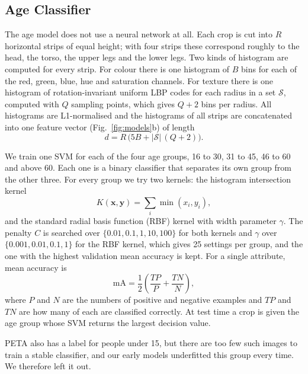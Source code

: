 \documentclass[conference]{IEEEtran}
\newcommand{\mA}{\mathrm{mA}}
\begin{document}
\subsection{Age Classifier}
The age model does not use a neural network at all. Each crop is cut into $R$
horizontal strips of equal height; with four strips these correspond roughly to
the head, the torso, the upper legs and the lower legs. Two kinds of histogram are
computed for every strip. For colour there is one histogram of $B$ bins for each of
the red, green, blue, hue and saturation channels. For texture there is one
histogram of rotation-invariant uniform LBP codes for each radius in a set
$\mathcal{S}$, computed with $Q$ sampling points, which gives $Q+2$ bins per
radius. All histograms are L1-normalised and the histograms of all strips are
concatenated into one feature vector (Fig.~\ref{fig:models}b) of length
\begin{equation}
  d = R\,\bigl(5B + |\mathcal{S}|\,(Q+2)\bigr).
  \label{eq:dim}
\end{equation}

We train one SVM for each of the four age groups, 16 to 30, 31 to 45, 46 to 60 and
above 60. Each one is a binary classifier that separates its own group from the
other three. For every group we try two kernels: the histogram intersection kernel
\begin{equation}
  K(\mathbf{x},\mathbf{y}) = \sum_{i}\min(x_i, y_i),
\end{equation}
and the standard radial basis function (RBF) kernel with width parameter $\gamma$.
The penalty $C$ is searched over $\{0.01, 0.1, 1, 10, 100\}$ for both kernels and
$\gamma$ over $\{0.001, 0.01, 0.1, 1\}$ for the RBF kernel, which gives 25 settings
per group, and the one with the highest validation mean accuracy is kept. For a
single attribute, mean accuracy is
\begin{equation}
  \mA = \frac{1}{2}\left(\frac{\mathit{TP}}{P} + \frac{\mathit{TN}}{N}\right),
  \label{eq:ma}
\end{equation}
where $P$ and $N$ are the numbers of positive and negative examples and
$\mathit{TP}$ and $\mathit{TN}$ are how many of each are classified correctly. At
test time a crop is given the age group whose SVM returns the largest decision
value.

PETA also has a label for people under 15, but there are too few such images to
train a stable classifier, and our early models underfitted this group every time.
We therefore left it out.
\end{document}
